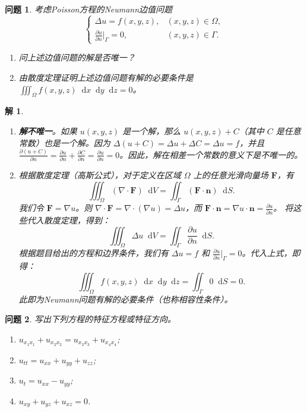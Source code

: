 \documentclass[12pt,a4paper]{article}
\newcommand{\diff}{\mathop{}\!\mathrm{d}}
\newtheorem{problem}{问题}
\newtheorem*{solution}{解}
\begin{document}
	\newpage
	
	\begin{problem}
		考虑Poisson方程的Neumann边值问题
		\[
		\begin{cases}
			\Delta u = f(x,y,z), & (x,y,z) \in \Omega, \\
			\frac{\partial u}{\partial n}\bigg|_{\Gamma} = 0, & (x,y,z) \in \Gamma.
		\end{cases}
		\]
		\begin{enumerate}[(1)]
			\item 问上述边值问题的解是否唯一？
			\item 由散度定理证明上述边值问题有解的必要条件是 \(\iiint_\Omega f(x,y,z) \diff x \diff y \diff z = 0\)。
		\end{enumerate}
	\end{problem}
	
	\begin{solution}
		\begin{enumerate}[(1)]
			\item \textbf{解不唯一}。如果 \(u(x,y,z)\) 是一个解，那么 \(u(x,y,z) + C\)（其中 \(C\) 是任意常数）也是一个解。因为 \(\Delta(u+C) = \Delta u + \Delta C = \Delta u = f\)，并且 \(\frac{\partial (u+C)}{\partial n} = \frac{\partial u}{\partial n} + \frac{\partial C}{\partial n} = \frac{\partial u}{\partial n} = 0\)。因此，解在相差一个常数的意义下是不唯一的。
			\item 根据散度定理（高斯公式），对于定义在区域 \(\Omega\) 上的任意光滑向量场 \(\mathbf{F}\)，有
			\[
			\iiint_\Omega (\nabla \cdot \mathbf{F}) \diff V = \iint_\Gamma (\mathbf{F} \cdot \mathbf{n}) \diff S.
			\]
			我们令 \(\mathbf{F} = \nabla u\)。则 \(\nabla \cdot \mathbf{F} = \nabla \cdot (\nabla u) = \Delta u\)，而 \(\mathbf{F} \cdot \mathbf{n} = \nabla u \cdot \mathbf{n} = \frac{\partial u}{\partial n}\)。
			将这些代入散度定理，得到：
			\[
			\iiint_\Omega \Delta u \diff V = \iint_\Gamma \frac{\partial u}{\partial n} \diff S.
			\]
			根据题目给出的方程和边界条件，我们有 \(\Delta u = f\) 和 \(\frac{\partial u}{\partial n}|_\Gamma = 0\)。代入上式，即得：
			\[
			\iiint_\Omega f(x,y,z) \diff x \diff y \diff z = \iint_\Gamma 0 \diff S = 0.
			\]
			此即为Neumann问题有解的必要条件（也称相容性条件）。
		\end{enumerate}
	\end{solution}
	
	\begin{problem}
		写出下列方程的特征方程或特征方向。
		\begin{enumerate}[(1)]
			\item \( u_{x_1x_1} + u_{x_2x_2} = u_{x_3x_3} + u_{x_4x_4} \);
			\item \( u_{tt} = u_{xx} + u_{yy} + u_{zz} \);
			\item \( u_t = u_{xx} - u_{yy} \);
			\item \( u_{xy} + u_{yz} + u_{xz} = 0 \).
		\end{enumerate}
	\end{problem}
	
\end{document}
